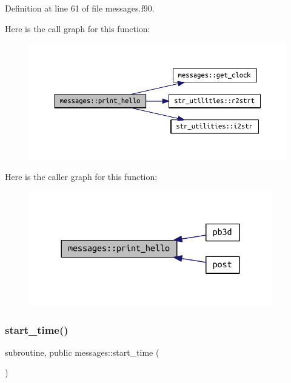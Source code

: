 Definition at line 61 of file messages.\+f90.

Here is the call graph for this function\+:
\nopagebreak
\begin{figure}[H]
\begin{center}
\leavevmode
\includegraphics[width=350pt]{namespacemessages_a60c95b4c352b0087f32ef87279da49ca_cgraph}
\end{center}
\end{figure}
Here is the caller graph for this function\+:
\nopagebreak
\begin{figure}[H]
\begin{center}
\leavevmode
\includegraphics[width=300pt]{namespacemessages_a60c95b4c352b0087f32ef87279da49ca_icgraph}
\end{center}
\end{figure}
\mbox{\label{namespacemessages_a84d5988f3ea5ca8dc2834032f896ae90}} 
\subsubsection{\texorpdfstring{start\+\_\+time()}{start\_time()}}
{\footnotesize\ttfamily subroutine, public messages\+::start\+\_\+time (\begin{DoxyParamCaption}{ }\end{DoxyParamCaption})}



